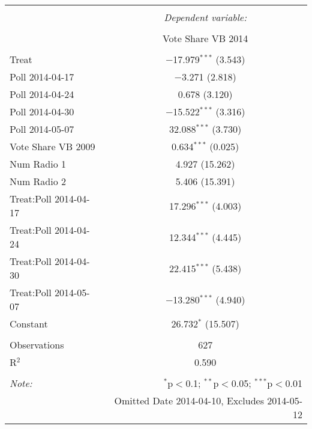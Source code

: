 
\begin{table}[!htbp] \centering 
\begin{tabular}{@{\extracolsep{5pt}}lc} 
\\[-1.8ex]\hline 
\hline \\[-1.8ex] 
 & \multicolumn{1}{c}{\textit{Dependent variable:}} \\ 
\cline{2-2} 
\\[-1.8ex] & Vote Share VB 2014 \\ 
\hline \\[-1.8ex] 
 Treat & $-$17.979$^{***}$ (3.543) \\ 
  Poll 2014-04-17 & $-$3.271 (2.818) \\ 
  Poll 2014-04-24 & 0.678 (3.120) \\ 
  Poll 2014-04-30 & $-$15.522$^{***}$ (3.316) \\ 
  Poll 2014-05-07 & 32.088$^{***}$ (3.730) \\ 
  Vote Share VB 2009 & 0.634$^{***}$ (0.025) \\ 
  Num Radio 1 & 4.927 (15.262) \\ 
  Num Radio 2 & 5.406 (15.391) \\ 
  Treat:Poll 2014-04-17 & 17.296$^{***}$ (4.003) \\ 
  Treat:Poll 2014-04-24 & 12.344$^{***}$ (4.445) \\ 
  Treat:Poll 2014-04-30 & 22.415$^{***}$ (5.438) \\ 
  Treat:Poll 2014-05-07 & $-$13.280$^{***}$ (4.940) \\ 
  Constant & 26.732$^{*}$ (15.507) \\ 
 \hline \\[-1.8ex] 
Observations & 627 \\ 
R$^{2}$ & 0.590 \\ 
\hline 
\hline \\[-1.8ex] 
\textit{Note:}  & \multicolumn{1}{r}{$^{*}$p$<$0.1; $^{**}$p$<$0.05; $^{***}$p$<$0.01} \\ 
 & \multicolumn{1}{r}{Omitted Date 2014-04-10, Excludes 2014-05-12} \\ 
\end{tabular} 
\end{table} 

